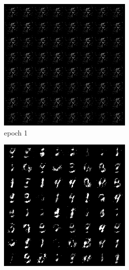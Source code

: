 \documentclass[a4paper]{article}
\theoremstyle{definition}
\newenvironment{soln}{
	\leavevmode\color{blue}\ignorespaces
}{}
\begin{document}
\begin{enumerate} [label=(\alph*)]
\begin{soln}
			\begin{figure}[H]
				\centering
				\begin{subfigure}[b]{0.3\textwidth}
					\centering
					\includegraphics[width=\textwidth]{outputs/q1/gen_img1.png}
					\caption{epoch 1}
				\end{subfigure}
				\hfill
				\begin{subfigure}[b]{0.3\textwidth}
					\centering
					\includegraphics[width=\textwidth]{outputs/q1/gen_img50.png}

\end{subfigure}
\end{figure}
\end{soln}
\end{enumerate}
\end{document}
